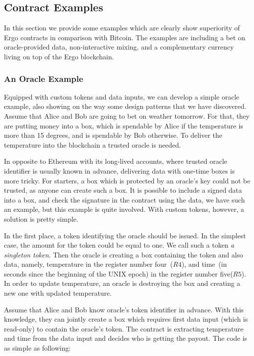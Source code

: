 \subsection{Contract Examples}
\label{sec:examples}

 In this section we provide some examples which are clearly show superiority of Ergo contracts in comparison with
 Bitcoin. The examples are including a bet on oracle-provided data, non-interactive mixing, and a complementary currency
 living on top of the Ergo blockchain.

 \subsubsection{An Oracle Example}
 \label{sec:platform}

 Equipped with custom tokens and data inputs, we can develop a simple oracle example, also showing on the way some
 design patterns that we have discovered. Assume that Alice and Bob are going to bet on weather tomorrow. For that,
 they are putting money into a box, which is spendable by
 Alice if the temperature is more than 15 degrees, and is spendable by Bob otherwise. To deliver the temperature into the
 blockchain a trusted oracle is needed.

 In opposite to Ethereum with its long-lived accounts, where trusted oracle identifier is usually known in advance,
 delivering data with one-time boxes is more tricky. For starters, a box which is protected by an oracle's key could
 not be trusted, as anyone can create such a box. It is possible to include a signed data into a box, and check the
 signature in the contract using the data, we have such an example, but this example is quite involved. With custom
 tokens, however, a solution is pretty simple.

 In the first place, a token identifying the oracle should be issued. In the simplest case, the amount for the token could
 be equal to one. We call such a token {\em a singleton token}. Then the oracle is creating a box containing the token
 and also data, namely, temperature in the register number four~($R4$), and time~(in seconds since the beginning of
 the UNIX epoch) in the register number five($R5$).
 In order to update temperature, an oracle is destroying the box and creating a new one with updated temperature.

 Assume that Alice and Bob know oracle's token identifier in advance. With this knowledge, they
 can jointly create a box which requires first data input (which is read-only) to contain the oracle's token. The
 contract is extracting temperature and time from the data input
 and decides who is getting the payout. The code is as simple as following:

